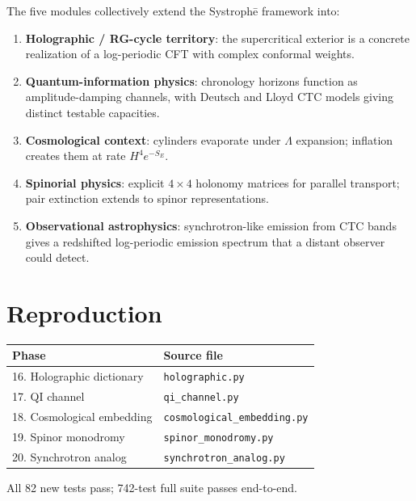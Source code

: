 \documentclass[11pt,a4paper]{article}
\begin{document}
The five modules collectively extend the Systroph\=e framework into:
\begin{enumerate}
\item \textbf{Holographic / RG-cycle territory}: the supercritical
  exterior is a concrete realization of a log-periodic CFT with
  complex conformal weights.
\item \textbf{Quantum-information physics}: chronology horizons
  function as amplitude-damping channels, with Deutsch and Lloyd CTC
  models giving distinct testable capacities.
\item \textbf{Cosmological context}: cylinders evaporate under $\Lambda$
  expansion; inflation creates them at rate $H^4 e^{-S_E}$.
\item \textbf{Spinorial physics}: explicit $4{\times}4$ holonomy
  matrices for parallel transport; pair extinction extends to
  spinor representations.
\item \textbf{Observational astrophysics}: synchrotron-like emission
  from CTC bands gives a redshifted log-periodic emission spectrum
  that a distant observer could detect.
\end{enumerate}

\section{Reproduction}

\begin{center}
\begin{tabular}{ll}
\toprule
Phase & Source file \\
\midrule
16. Holographic dictionary & \texttt{holographic.py} \\
17. QI channel & \texttt{qi\_channel.py} \\
18. Cosmological embedding & \texttt{cosmological\_embedding.py} \\
19. Spinor monodromy & \texttt{spinor\_monodromy.py} \\
20. Synchrotron analog & \texttt{synchrotron\_analog.py} \\
\bottomrule
\end{tabular}
\end{center}

All 82 new tests pass; 742-test full suite passes end-to-end.
\end{document}
